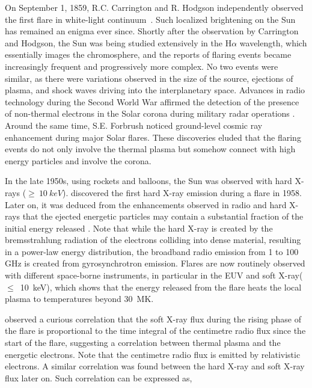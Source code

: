 On September 1, 1859, R.C. Carrington and R. Hodgson independently observed the first flare in white-light continuum~\citep{carrington1859,hodgson1859}. Such localized brightening on the Sun has remained an enigma ever since. 
Shortly after the observation by Carrington and Hodgson, the Sun was being studied extensively in the H$\alpha$ wavelength, which essentially images the chromosphere, and the reports of flaring events became increasingly frequent and progressively more complex. No two events were similar, as there were variations observed in the size of the source, ejections of plasma, and shock waves driving into the interplanetary space. Advances in radio technology during the Second World War affirmed the detection of the presence of non-thermal electrons in the Solar corona during military radar operations \citep{hey46}. Around the same time, S.E. Forbrush noticed ground-level cosmic ray enhancement during major Solar flares. These discoveries eluded that the flaring events do not only involve the thermal plasma but somehow connect with high energy particles and involve the corona. 

In the late 1950s, using rockets and balloons, the Sun was observed with hard X-rays ($\ge~10~keV$). \cite{peterson59} discovered the first hard X-ray emission during a flare in 1958. Later on, it was deduced from the enhancements observed in radio and hard X-rays that the ejected energetic particles may contain a substantial fraction of the initial energy released \citep{brown71}. Note that while the hard X-ray is created by the bremsstrahlung radiation of the electrons colliding into dense material, resulting in a power-law energy distribution, the broadband radio emission from 1 to 100 GHz is created from gyrosynchrotron emission. Flares are now routinely observed with different space-borne instruments, in particular in the EUV and soft X-ray($\le$~10~keV), which shows that the energy released from the flare heats the local plasma to temperatures beyond 30~MK.


\cite{neupert68} observed a curious correlation that the soft X-ray flux during the rising phase of the flare is proportional to the time integral of the centimetre radio flux since the start of the flare, suggesting a correlation between thermal plasma and the energetic electrons. Note that the centimetre radio flux is emitted by relativistic electrons. A similar correlation was found between the hard X-ray and soft X-ray flux later on. Such correlation can be expressed as,

